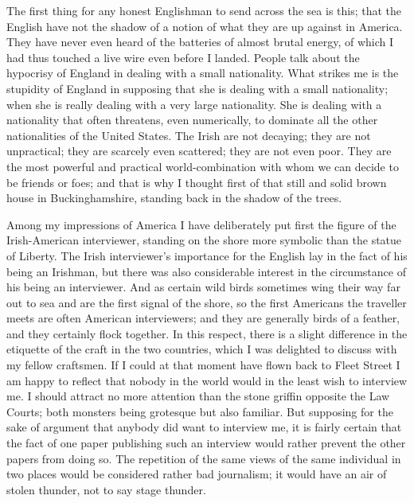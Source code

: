 \documentclass{book}
\begin{document}
The first thing for any honest Englishman to send across the sea is this; that the English have not the shadow of a notion of what they are up against in America. They have never even heard of the batteries of almost brutal energy, of which I had thus touched a live wire even before I landed. People talk about the hypocrisy of England in dealing with a small nationality. What strikes me is the stupidity of England in supposing that she is dealing with a small nationality; when she is really dealing with a very large nationality. She is dealing with a nationality that often threatens, even numerically, to dominate all the other nationalities of the United States. The Irish are not decaying; they are not unpractical; they are scarcely even scattered; they are not even poor. They are the most powerful and practical world-combination with whom we can decide to be friends or foes; and that is why I thought first of that still and solid brown house in Buckinghamshire, standing back in the shadow of the trees.

Among my impressions of America I have deliberately put first the figure of the Irish-American interviewer, standing on the shore more symbolic than the statue of Liberty. The Irish interviewer’s importance for the English lay in the fact of his being an Irishman, but there was also considerable interest in the circumstance of his being an interviewer. And as certain wild birds sometimes wing their way far out to sea and are the first signal of the shore, so the first Americans the traveller meets are often American interviewers; and they are generally birds of a feather, and they certainly flock together. In this respect, there is a slight difference in the etiquette of the craft in the two countries, which I was delighted to discuss with my fellow craftsmen. If I could at that moment have flown back to Fleet Street I am happy to reflect that nobody in the world would in the least wish to interview me. I should attract no more attention than the stone griffin opposite the Law Courts; both monsters being grotesque but also familiar. But supposing for the sake of argument that anybody did want to interview me, it is fairly certain that the fact of one paper publishing such an interview would rather prevent the other papers from doing so. The repetition of the same views of the same individual in two places would be considered rather bad journalism; it would have an air of stolen thunder, not to say stage thunder.
\end{document}
